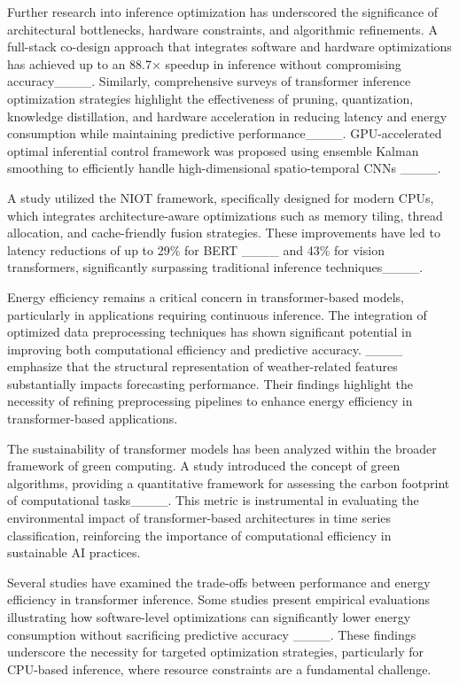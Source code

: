 Further research into inference optimization has underscored the significance of architectural bottlenecks, hardware constraints, and algorithmic refinements. A full-stack co-design approach that integrates software and hardware optimizations has achieved up to an 88.7× speedup in inference without compromising accuracy____. Similarly, comprehensive surveys of transformer inference optimization strategies highlight the effectiveness of pruning, quantization, knowledge distillation, and hardware acceleration in reducing latency and energy consumption while maintaining predictive performance____.
GPU-accelerated optimal inferential control framework was proposed using ensemble Kalman smoothing to efficiently handle high-dimensional spatio-temporal CNNs ____.

A study utilized the NIOT framework, specifically designed for modern CPUs, which integrates architecture-aware optimizations such as memory tiling, thread allocation, and cache-friendly fusion strategies. These improvements have led to latency reductions of up to 29\% for BERT ____ and 43\% for vision transformers, significantly surpassing traditional inference techniques____.



Energy efficiency remains a critical concern in transformer-based models, particularly in applications requiring continuous inference. The integration of optimized data preprocessing techniques has shown significant potential in improving both computational efficiency and predictive accuracy. ____ emphasize that the structural representation of weather-related features substantially impacts forecasting performance. Their findings highlight the necessity of refining preprocessing pipelines to enhance energy efficiency in transformer-based applications.

The sustainability of transformer models has been analyzed within the broader framework of green computing. A study introduced the concept of green algorithms, providing a quantitative framework for assessing the carbon footprint of computational tasks____. This metric is instrumental in evaluating the environmental impact of transformer-based architectures in time series classification, reinforcing the importance of computational efficiency in sustainable AI practices.

Several studies have examined the trade-offs between performance and energy efficiency in transformer inference. Some studies present empirical evaluations illustrating how software-level optimizations can significantly lower energy consumption without sacrificing predictive accuracy ____. These findings underscore the necessity for targeted optimization strategies, particularly for CPU-based inference, where resource constraints are a fundamental challenge.

